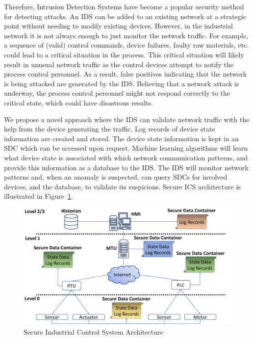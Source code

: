 \documentclass[conference]{IEEEtran}
\begin{document}

Therefore, Intrusion Detection Systems have become a popular security method for detecting attacks.  An IDS can be added to an existing network at a strategic point without needing to modify existing devices.
However, in the industrial network it is not always enough to just monitor the network traffic. For example, a sequence of (valid) control commands, device failures, faulty raw materials, etc. could lead to a critical situation in the process.  This critical situation will likely result in unusual network traffic as the control devices attempt to notify the process control personnel. As a result, false positives indicating that the network is being attacked are generated by the IDS.  Believing that a network attack is underway, the process control personnel might not respond correctly to the critical state, which could have disastrous results. 

We propose a novel approach where the IDS can validate network traffic with the help from the device generating the traffic. Log records of device state information are created and stored. The device state information is kept in an SDC which can be accessed upon request. Machine learning algorithms will learn what device state is associated with which network communication patterns, and provide this information as a database to the IDS. The IDS will monitor network patterns and, when an anomaly is suspected, can query SDCs for involved devices, and the database, to validate its suspicions. Secure ICS architecture is illustrated in Figure~\ref{SICSA}. 

\begin{figure}[htbp]
\centering
\centerline{\includegraphics [width=.5\textwidth]{sec_arch.png}}
\caption{Secure Industrial Control System Architecture}
\label{SICSA}
\end{figure}
\end{document}
